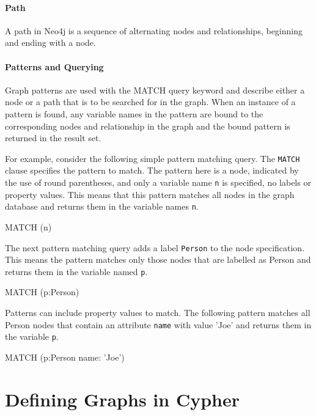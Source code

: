 \paragraph*{Path}
A path in Neo4j is a sequence of alternating nodes and relationships, beginning and ending with a node.

\paragraph*{Patterns and Querying}

Graph patterns are used with the MATCH query keyword and describe either a node or a path that is to be searched for in the graph. When an instance of a pattern is found, any variable names in the pattern are bound to the corresponding nodes and relationship in the graph and the bound pattern is returned in the result set.

For example, consider the following simple pattern matching query. The \texttt{MATCH} clause specifies the pattern to match. The pattern here is a node, indicated by the use of round parentheses, and only a variable name \texttt{n} is specified, no labels or property values. This means that this pattern matches all nodes in the graph database and returns them in the variable names \texttt{n}.

\begin{cyphercode}
MATCH (n)
\end{cyphercode}

The next pattern matching query adds a label \texttt{Person} to the node specification. This means the pattern matches only those nodes that are labelled as Person and returns them in the variable named \texttt{p}.

\begin{cyphercode}
MATCH (p:Person)
\end{cyphercode}

Patterns can include property values to match. The following pattern matches all Person nodes that contain an attribute \texttt{name} with value 'Joe' and returns them in the variable \texttt{p}.

\begin{cyphercode}
MATCH (p:Person {name: 'Joe'})
\end{cyphercode}


\section{Defining Graphs in Cypher}

